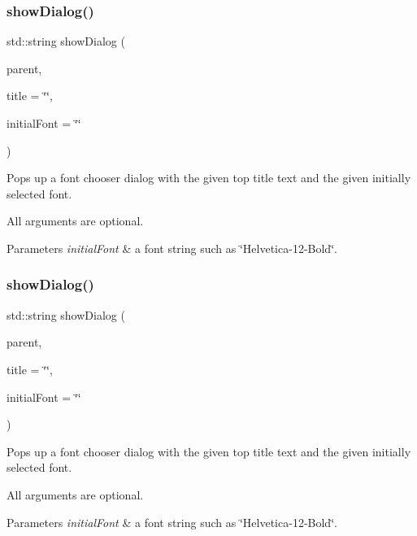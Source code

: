 \subsubsection{\texorpdfstring{show\+Dialog()}{showDialog()}\hspace{0.1cm}{\footnotesize\ttfamily [2/3]}}
{\footnotesize\ttfamily std\+::string show\+Dialog (\begin{DoxyParamCaption}\item[{\mbox{\hyperlink{classGWindow}{G\+Window}} $\ast$}]{parent,  }\item[{const std\+::string \&}]{title = {\ttfamily \char`\"{}\char`\"{}},  }\item[{const std\+::string \&}]{initial\+Font = {\ttfamily \char`\"{}\char`\"{}} }\end{DoxyParamCaption})\hspace{0.3cm}{\ttfamily [static]}}



Pops up a font chooser dialog with the given top title text and the given initially selected font. 

All arguments are optional. 
\begin{DoxyParams}{Parameters}
{\em initial\+Font} & a font string such as \char`\"{}\+Helvetica-\/12-\/\+Bold\char`\"{}. \\
\hline
\end{DoxyParams}
\mbox{\label{classGFontChooser_a7e0ac529f6e2c4877b13e7a2f06a1bea}} 
\subsubsection{\texorpdfstring{show\+Dialog()}{showDialog()}\hspace{0.1cm}{\footnotesize\ttfamily [3/3]}}
{\footnotesize\ttfamily std\+::string show\+Dialog (\begin{DoxyParamCaption}\item[{Q\+Widget $\ast$}]{parent,  }\item[{const std\+::string \&}]{title = {\ttfamily \char`\"{}\char`\"{}},  }\item[{const std\+::string \&}]{initial\+Font = {\ttfamily \char`\"{}\char`\"{}} }\end{DoxyParamCaption})\hspace{0.3cm}{\ttfamily [static]}}



Pops up a font chooser dialog with the given top title text and the given initially selected font. 

All arguments are optional. 
\begin{DoxyParams}{Parameters}
{\em initial\+Font} & a font string such as \char`\"{}\+Helvetica-\/12-\/\+Bold\char`\"{}. \\
\hline
\end{DoxyParams}
